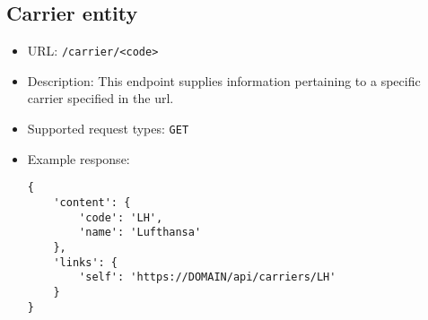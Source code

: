 \documentclass{article}
\begin{document}
	\subsection{Carrier entity}
    	\begin{itemize}
    		\item URL: \texttt{/carrier/<code>}
    		\item Description: This endpoint supplies information pertaining to a specific carrier specified in the url.
    		\item Supported request types: \texttt{GET}
    		\item Example response:
    		\begin{lstlisting}
{
    'content': {
		'code': 'LH',
		'name': 'Lufthansa'
	},
    'links': {
        'self': 'https://DOMAIN/api/carriers/LH'
    }
}

			\end{lstlisting}
		\end{itemize}
		
\end{document}
